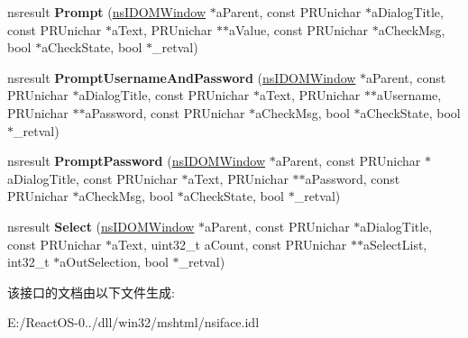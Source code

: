 \begin{DoxyCompactItemize}
\item 
\mbox{\label{interfacens_i_prompt_service_ac6421a9940d16c190119d5016a3e3425}} 
nsresult {\bfseries Prompt} (\hyperlink{interfacens_i_d_o_m_window}{ns\+I\+D\+O\+M\+Window} $\ast$a\+Parent, const P\+R\+Unichar $\ast$a\+Dialog\+Title, const P\+R\+Unichar $\ast$a\+Text, P\+R\+Unichar $\ast$$\ast$a\+Value, const P\+R\+Unichar $\ast$a\+Check\+Msg, bool $\ast$a\+Check\+State, bool $\ast$\+\_\+retval)
\item 
\mbox{\label{interfacens_i_prompt_service_abcd886b195f7ce15f936ea96004e89c4}} 
nsresult {\bfseries Prompt\+Username\+And\+Password} (\hyperlink{interfacens_i_d_o_m_window}{ns\+I\+D\+O\+M\+Window} $\ast$a\+Parent, const P\+R\+Unichar $\ast$a\+Dialog\+Title, const P\+R\+Unichar $\ast$a\+Text, P\+R\+Unichar $\ast$$\ast$a\+Username, P\+R\+Unichar $\ast$$\ast$a\+Password, const P\+R\+Unichar $\ast$a\+Check\+Msg, bool $\ast$a\+Check\+State, bool $\ast$\+\_\+retval)
\item 
\mbox{\label{interfacens_i_prompt_service_ad56b92ed329ca3342f4c075ad1c66f15}} 
nsresult {\bfseries Prompt\+Password} (\hyperlink{interfacens_i_d_o_m_window}{ns\+I\+D\+O\+M\+Window} $\ast$a\+Parent, const P\+R\+Unichar $\ast$a\+Dialog\+Title, const P\+R\+Unichar $\ast$a\+Text, P\+R\+Unichar $\ast$$\ast$a\+Password, const P\+R\+Unichar $\ast$a\+Check\+Msg, bool $\ast$a\+Check\+State, bool $\ast$\+\_\+retval)
\item 
\mbox{\label{interfacens_i_prompt_service_accfd04e6d430d85dc2f0f356207fbfe6}} 
nsresult {\bfseries Select} (\hyperlink{interfacens_i_d_o_m_window}{ns\+I\+D\+O\+M\+Window} $\ast$a\+Parent, const P\+R\+Unichar $\ast$a\+Dialog\+Title, const P\+R\+Unichar $\ast$a\+Text, uint32\+\_\+t a\+Count, const P\+R\+Unichar $\ast$$\ast$a\+Select\+List, int32\+\_\+t $\ast$a\+Out\+Selection, bool $\ast$\+\_\+retval)
\end{DoxyCompactItemize}


该接口的文档由以下文件生成\+:\begin{DoxyCompactItemize}
\item 
E\+:/\+React\+O\+S-\/0../dll/win32/mshtml/nsiface.\+idl\end{DoxyCompactItemize}
